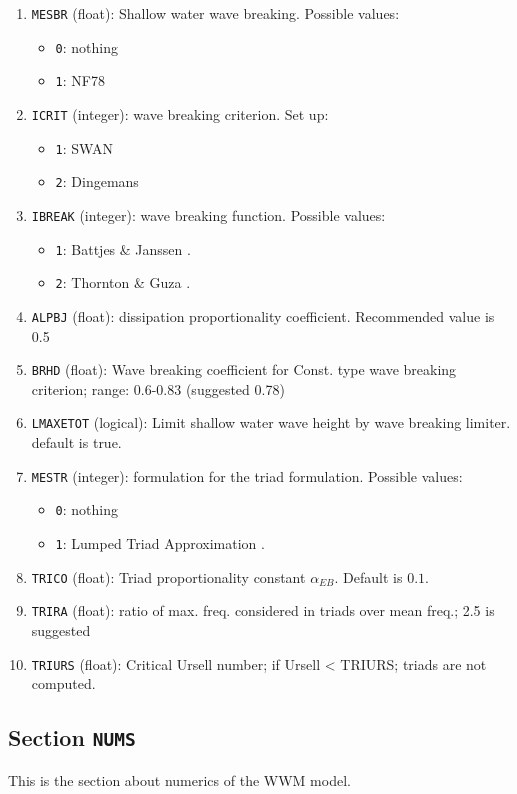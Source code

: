 \documentclass[12pt]{amsart}
\begin{document}
\begin{enumerate}
\item {\tt MESBR} (float): Shallow water wave breaking. Possible values:
  \begin{itemize}
  \item {\tt 0}: nothing
  \item {\tt 1}: NF78
  \end{itemize}
\item {\tt ICRIT} (integer): wave breaking criterion. Set up:
  \begin{itemize}
  \item {\tt 1}: SWAN
  \item {\tt 2}: Dingemans
  \end{itemize}
\item {\tt IBREAK} (integer): wave breaking function. Possible values:
  \begin{itemize}
  \item {\tt 1}: Battjes \& Janssen \cite{BattjesJanssen}.
  \item {\tt 2}: Thornton \& Guza \cite{ThorntonGuza}.
  \end{itemize}
\item {\tt ALPBJ} (float): dissipation proportionality coefficient. Recommended value is 0.5
\item {\tt BRHD} (float): Wave breaking coefficient for Const. type wave breaking criterion; range: 0.6-0.83 (suggested 0.78)
\item {\tt LMAXETOT} (logical): Limit shallow water wave height by wave breaking limiter. default is true.
\item {\tt MESTR} (integer): formulation for the triad formulation. Possible values:
  \begin{itemize}
  \item {\tt 0}: nothing
  \item {\tt 1}: Lumped Triad Approximation \cite{LTA}.
  \end{itemize}
\item {\tt TRICO} (float): Triad proportionality constant $\alpha_{EB}$. Default is $0.1$.
\item {\tt TRIRA} (float): ratio of max. freq. considered in triads over mean freq.; 2.5 is suggested
\item {\tt TRIURS} (float): Critical Ursell number; if Ursell < TRIURS; triads are not computed.
\end{enumerate}




\subsection{Section {\tt NUMS}}
This is the section about numerics of the WWM model.
\end{document}
